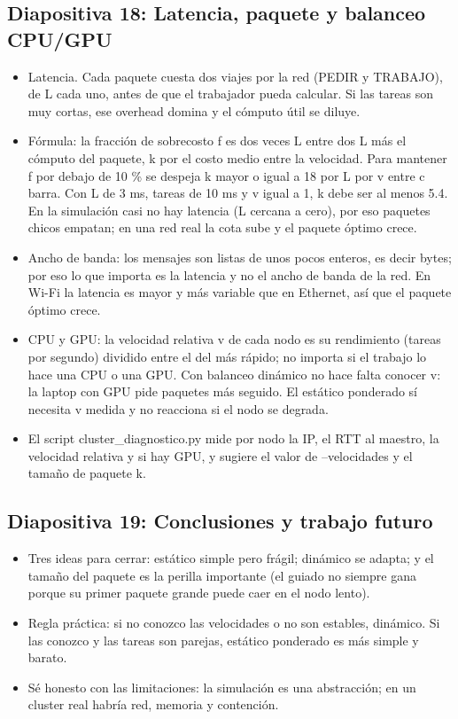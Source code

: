 \documentclass[11pt,a4paper]{article}
\begin{document}
\subsection*{Diapositiva 18: Latencia, paquete y balanceo CPU/GPU}
\begin{itemize}
  \item Latencia. Cada paquete cuesta dos viajes por la red (PEDIR y TRABAJO), de L cada uno, antes de que el trabajador pueda calcular. Si las tareas son muy cortas, ese overhead domina y el cómputo útil se diluye.
  \item Fórmula: la fracción de sobrecosto f es dos veces L entre dos L más el cómputo del paquete, k por el costo medio entre la velocidad. Para mantener f por debajo de 10 \% se despeja k mayor o igual a 18 por L por v entre c barra. Con L de 3 ms, tareas de 10 ms y v igual a 1, k debe ser al menos 5.4. En la simulación casi no hay latencia (L cercana a cero), por eso paquetes chicos empatan; en una red real la cota sube y el paquete óptimo crece.
  \item Ancho de banda: los mensajes son listas de unos pocos enteros, es decir bytes; por eso lo que importa es la latencia y no el ancho de banda de la red. En Wi-Fi la latencia es mayor y más variable que en Ethernet, así que el paquete óptimo crece.
  \item CPU y GPU: la velocidad relativa v de cada nodo es su rendimiento (tareas por segundo) dividido entre el del más rápido; no importa si el trabajo lo hace una CPU o una GPU. Con balanceo dinámico no hace falta conocer v: la laptop con GPU pide paquetes más seguido. El estático ponderado sí necesita v medida y no reacciona si el nodo se degrada.
  \item El script cluster\_diagnostico.py mide por nodo la IP, el RTT al maestro, la velocidad relativa y si hay GPU, y sugiere el valor de --velocidades y el tamaño de paquete k.
\end{itemize}

\subsection*{Diapositiva 19: Conclusiones y trabajo futuro}
\begin{itemize}
  \item Tres ideas para cerrar: estático simple pero frágil; dinámico se adapta; y el tamaño del paquete es la perilla importante (el guiado no siempre gana porque su primer paquete grande puede caer en el nodo lento).
  \item Regla práctica: si no conozco las velocidades o no son estables, dinámico. Si las conozco y las tareas son parejas, estático ponderado es más simple y barato.
  \item Sé honesto con las limitaciones: la simulación es una abstracción; en un cluster real habría red, memoria y contención.
\end{itemize}
\end{document}
